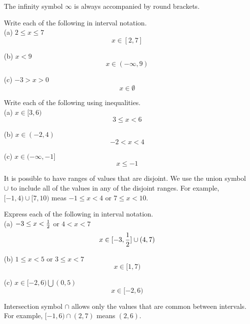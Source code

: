 The infinity symbol $ \infty $ is always accompanied by round brackets. \\

\begin{exercise}\nonumber
	Write each of the following in interval notation. \\

	(a) $ 2 \le x \le 7 $ \\
	$$
		x \in [2, 7]
	$$

	(b) $ x < 9 $ \\
	$$
		x \in (-\infty, 9)
	$$

	(c) $ -3 > x > 0 $ \\
	$$
		x \in \emptyset
	$$
\end{exercise}

\begin{exercise}\nonumber
	Write each of the following using inequalities. \\

	(a) $ x \in [3, 6) $ \\
				$$
					3 \le x < 6
				$$

				(b) $ x \in (-2, 4) $ \\
				$$
					-2 < x < 4
				$$

				(c) $ x \in (-\infty, -1] $ \\
	$$
		x \le -1
	$$
\end{exercise}

It is possible to have ranges of values that are disjoint. We use the union symbol $ \cup $ to include all of the values in any of the disjoint ranges. For example, $ [-1, 4) \cup [7, 10) $ meas $ -1 \le x < 4 $ or $ 7 \le x < 10 $. \\

\begin{exercise}\nonumber
	Express each of the following in interval notation. \\

	(a) $ -3 \le x < {1 \over 2} $ or $ 4 < x < 7 $ \\
	$$
		x \in [-3, {1 \over 2}] \cup (4, 7)
	$$

	(b) $ 1 \le x < 5 $ or $ 3 \le x < 7 $ \\
	$$
		x \in [1, 7)
	$$

	(c) $ x \in [-2, 6) \bigcup (0, 5) $ \\
	$$
		x \in [-2, 6)
	$$
\end{exercise}

Intersection symbol $ \cap $ allows only the values that are common between intervals. For example, $ [-1, 6) \cap (2, 7) $ means $ (2, 6) $. \\

